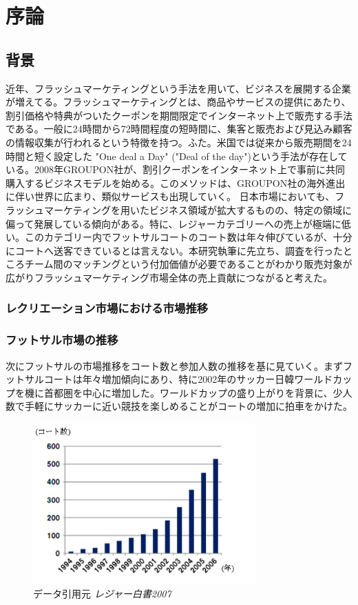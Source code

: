 \chapter{序論}
\label{intro}
\section{背景}
近年、フラッシュマーケティングという手法を用いて、ビジネスを展開する企業が増えてる。フラッシュマーケティングとは、商品やサービスの提供にあたり、割引価格や特典がついたクーポンを期間限定でインターネット上で販売する手法である。一般に24時間から72時間程度の短時間に、集客と販売および見込み顧客の情報収集が行われるという特徴を持つ。ふた。米国では従来から販売期間を24時間と短く設定した "One deal a Day" ("Deal of the day")という手法が存在している。2008年GROUPON社が、割引クーポンをインターネット上で事前に共同購入するビジネスモデルを始める。このメソッドは、GROUPON社の海外進出に伴い世界に広まり、類似サービスも出現していく。
日本市場においても、フラッシュマーケティングを用いたビジネス領域が拡大するものの、特定の領域に偏って発展している傾向がある。特に、レジャーカテゴリーへの売上が極端に低い。このカテゴリー内でフットサルコートのコート数は年々伸びているが、十分にコートへ送客できているとは言えない。本研究執筆に先立ち、調査を行ったところチーム間のマッチングという付加価値が必要であることがわかり販売対象が広がりフラッシュマーケティング市場全体の売上貢献につながると考えた。

\subsection{レクリエーション市場における市場推移}

\subsection{フットサル市場の推移}
次にフットサルの市場推移をコート数と参加人数の推移を基に見ていく。まずフットサルコートは年々増加傾向にあり、特に2002年のサッカー日韓ワールドカップを機に首都圏を中心に増加した。ワールドカップの盛り上がりを背景に、少人数で手軽にサッカーに近い競技を楽しめることがコートの増加に拍車をかけた。



\begin{figure}[htbp]
	\centering
	\includegraphics[width=85mm, bb=0 0 330 272]{figures/court.jpg}
	\caption{データ引用元 {\itshape レジャー白書2007}}
	\label{レジャー白書2007}
\end{figure}

